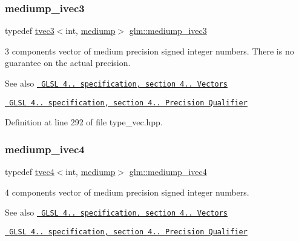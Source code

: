 \subsubsection{\texorpdfstring{mediump\_ivec3}{mediump\_ivec3}}
{\footnotesize\ttfamily typedef \mbox{\hyperlink{structglm_1_1tvec3}{tvec3}}$<$int, \mbox{\hyperlink{namespaceglm_a0f04f086094c747d227af4425893f545a6416f3ea0c9025fb21ed50c4d6620482}{mediump}}$>$ \mbox{\hyperlink{group__core__precision_ga16a38c6077c2e83375ee258cd95e224b}{glm\+::mediump\+\_\+ivec3}}}

3 components vector of medium precision signed integer numbers. There is no guarantee on the actual precision.

\begin{DoxySeeAlso}{See also}
\href{http://www.opengl.org/registry/doc/GLSLangSpec.4.20.8.pdf}{\texttt{ G\+L\+SL 4.. specification, section 4.. Vectors}} 

\href{http://www.opengl.org/registry/doc/GLSLangSpec.4.20.8.pdf}{\texttt{ G\+L\+SL 4.. specification, section 4.. Precision Qualifier}} 
\end{DoxySeeAlso}


Definition at line 292 of file type\+\_\+vec.\+hpp.

\mbox{\label{group__core__precision_ga687eefa63b2c9d0969227eaf23b1ad41}} 
\subsubsection{\texorpdfstring{mediump\_ivec4}{mediump\_ivec4}}
{\footnotesize\ttfamily typedef \mbox{\hyperlink{structglm_1_1tvec4}{tvec4}}$<$int, \mbox{\hyperlink{namespaceglm_a0f04f086094c747d227af4425893f545a6416f3ea0c9025fb21ed50c4d6620482}{mediump}}$>$ \mbox{\hyperlink{group__core__precision_ga687eefa63b2c9d0969227eaf23b1ad41}{glm\+::mediump\+\_\+ivec4}}}

4 components vector of medium precision signed integer numbers.

\begin{DoxySeeAlso}{See also}
\href{http://www.opengl.org/registry/doc/GLSLangSpec.4.20.8.pdf}{\texttt{ G\+L\+SL 4.. specification, section 4.. Vectors}} 

\href{http://www.opengl.org/registry/doc/GLSLangSpec.4.20.8.pdf}{\texttt{ G\+L\+SL 4.. specification, section 4.. Precision Qualifier}} 
\end{DoxySeeAlso}


